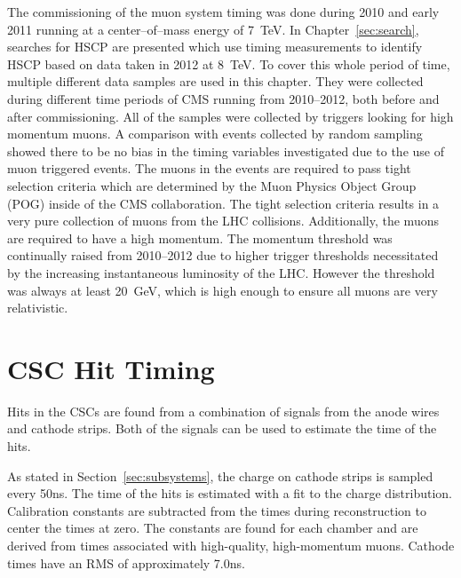 The commissioning of the muon system timing was done during 2010 and early 2011 running at a center--of--mass energy of 7~TeV.
In Chapter~\ref{sec:search}, searches for HSCP are presented which use
timing measurements to identify HSCP based on data taken in 2012 at 8~TeV.
To cover this whole period of time,
multiple different data samples are used in this chapter. They were collected during different time periods of CMS running from 2010--2012, both before and after commissioning.
All of the samples were collected by triggers looking for high momentum muons. A comparison with events collected by random sampling showed there to be no
bias in the timing variables investigated due to the use of muon triggered events.
The muons in the events are required to pass tight selection criteria which are determined by the Muon Physics Object Group (POG) inside of the CMS collaboration.
The tight selection criteria results in a very pure collection of muons from the LHC collisions.
Additionally, the muons are required to have a high momentum. The momentum threshold was continually raised from 2010--2012 due to higher trigger thresholds
necessitated by the increasing instantaneous luminosity of the LHC.
However the threshold was always at least 20~GeV, which is high enough to ensure all muons are very relativistic.

\section{CSC Hit Timing}
Hits in the CSCs are found from a combination of signals from the anode wires and cathode strips. Both of the signals can be used to estimate the time of the hits.

As stated in Section~\ref{sec:subsystems}, the charge on cathode strips is sampled every 50ns.
The time of the hits is estimated with a fit to the charge distribution. Calibration constants are subtracted from the times during reconstruction to center the times at zero.
The constants are found for each chamber and are derived from times associated with high-quality, high-momentum muons. Cathode times have an RMS of approximately 7.0ns.

